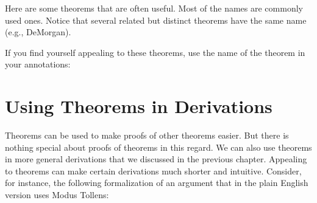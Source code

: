 Here are some theorems that are often useful. Most of the names are commonly 
used ones. Notice that several related but distinct theorems have the same name 
(e.g., DeMorgan).

If you find yourself appealing to these theorems, use the name of the theorem in 
your annotations: 

\newpage


\begin{theorems}


















\end{theorems}


\section{Using Theorems in Derivations}

Theorems can be used to make proofs of other theorems easier. But there is 
nothing special about proofs of theorems in this regard. We can also use 
theorems in more general derivations that we discussed in the previous chapter.  
Appealing to theorems can make certain derivations much shorter and intuitive.  
Consider, for instance, the following formalization of an argument that in the 
plain English version uses Modus Tollens:

